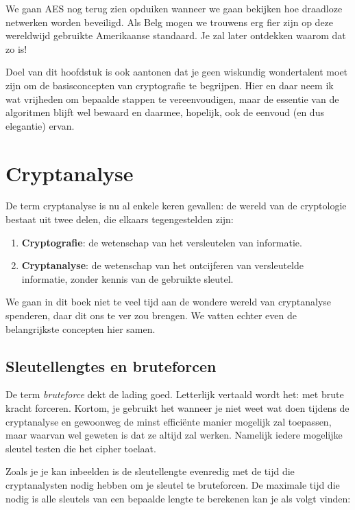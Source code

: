 \documentclass[
  10pt,
  dutch,
  paper=a4,
  ,captions=tableheading
]{scrbook}
\providecommand{\tightlist}{%
  \setlength{\itemsep}{0pt}\setlength{\parskip}{0pt}}
\begin{document}
We gaan AES nog terug zien opduiken wanneer we gaan bekijken hoe
draadloze netwerken worden beveiligd. Als Belg mogen we trouwens erg
fier zijn op deze wereldwijd gebruikte Amerikaanse standaard. Je zal
later ontdekken waarom dat zo is!

\begin{tipblock}
Doel van dit hoofdstuk is ook aantonen dat je geen wiskundig
wondertalent moet zijn om de basisconcepten van cryptografie te
begrijpen. Hier en daar neem ik wat vrijheden om bepaalde stappen te
vereenvoudigen, maar de essentie van de algoritmen blijft wel bewaard en
daarmee, hopelijk, ook de eenvoud (en dus elegantie) ervan.
\end{tipblock}

\section{Cryptanalyse}\label{cryptanalyse}

De term cryptanalyse is nu al enkele keren gevallen: de wereld van de
cryptologie bestaat uit twee delen, die elkaars tegengestelden zijn:

\begin{enumerate}
\def\labelenumi{\arabic{enumi}.}
\tightlist
\item
  \textbf{Cryptografie}: de wetenschap van het versleutelen van
  informatie.
\item
  \textbf{Cryptanalyse}: de wetenschap van het ontcijferen van
  versleutelde informatie, zonder kennis van de gebruikte sleutel.
\end{enumerate}

We gaan in dit boek niet te veel tijd aan de wondere wereld van
cryptanalyse spenderen, daar dit ons te ver zou brengen. We vatten
echter even de belangrijkste concepten hier samen.

\subsection{Sleutellengtes en
bruteforcen}\label{sleutellengtes-en-bruteforcen}

De term \emph{bruteforce} dekt de lading goed. Letterlijk vertaald wordt
het: met brute kracht forceren. Kortom, je gebruikt het wanneer je niet
weet wat doen tijdens de cryptanalyse en gewoonweg de minst efficiënte
manier mogelijk zal toepassen, maar waarvan wel geweten is dat ze altijd
zal werken. Namelijk iedere mogelijke sleutel testen die het cipher
toelaat.

Zoals je je kan inbeelden is de sleutellengte evenredig met de tijd die
cryptanalysten nodig hebben om je sleutel te bruteforcen. De maximale
tijd die nodig is alle sleutels van een bepaalde lengte te berekenen kan
je als volgt vinden:
\end{document}
